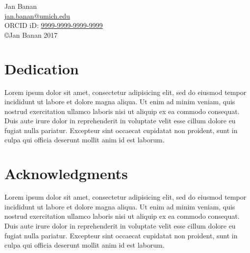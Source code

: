 \vfill

\begin{center}
\begin{onehalfspacing}
  Jan Banan \\
  \href{mailto:jan.banan@umich.edu}{\color{black}jan.banan@umich.edu} \\
  ORCID iD: \href{http://orcid.org/9999-9999-9999-9999}{\color{black}9999-9999-9999-9999}\\
  \vspace{0.3in}
  \copyright\;Jan Banan 2017
\end{onehalfspacing}
\end{center}

\vfill
\hspace{0pt}

\clearpage

\listoftodos

\setcounter{page}{2}

\chapter{Dedication}
\begin{onehalfspace}
Lorem ipsum dolor sit amet, consectetur adipisicing elit, sed do eiusmod
tempor incididunt ut labore et dolore magna aliqua. Ut enim ad minim veniam,
quis nostrud exercitation ullamco laboris nisi ut aliquip ex ea commodo
consequat. Duis aute irure dolor in reprehenderit in voluptate velit esse
cillum dolore eu fugiat nulla pariatur. Excepteur sint occaecat cupidatat non
proident, sunt in culpa qui officia deserunt mollit anim id est laborum.
\end{onehalfspace}

\chapter{Acknowledgments}
\begin{onehalfspace}
Lorem ipsum dolor sit amet, consectetur adipisicing elit, sed do eiusmod
tempor incididunt ut labore et dolore magna aliqua. Ut enim ad minim veniam,
quis nostrud exercitation ullamco laboris nisi ut aliquip ex ea commodo
consequat. Duis aute irure dolor in reprehenderit in voluptate velit esse
cillum dolore eu fugiat nulla pariatur. Excepteur sint occaecat cupidatat non
proident, sunt in culpa qui officia deserunt mollit anim id est laborum.
\end{onehalfspace}

